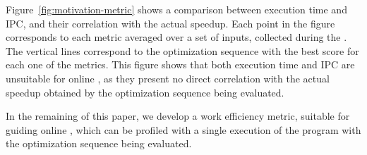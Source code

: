 Figure~\ref{fig:motivation-metric} shows a comparison between execution time and IPC,
and their correlation with the actual speedup.
Each point in the figure corresponds to each metric averaged over 
a set of inputs, collected during the {\itercomp}.
The vertical lines correspond to the optimization sequence 
with the best score for each one of the metrics.
This figure shows that both execution time and IPC are unsuitable for
online {\itercomp}, as they present no direct correlation with the actual
speedup obtained by the optimization sequence being evaluated.

In the remaining of this paper, we develop a work efficiency metric, suitable
for guiding online {\itercomp}, which can be profiled with a single execution
of the program with the optimization sequence being evaluated.

